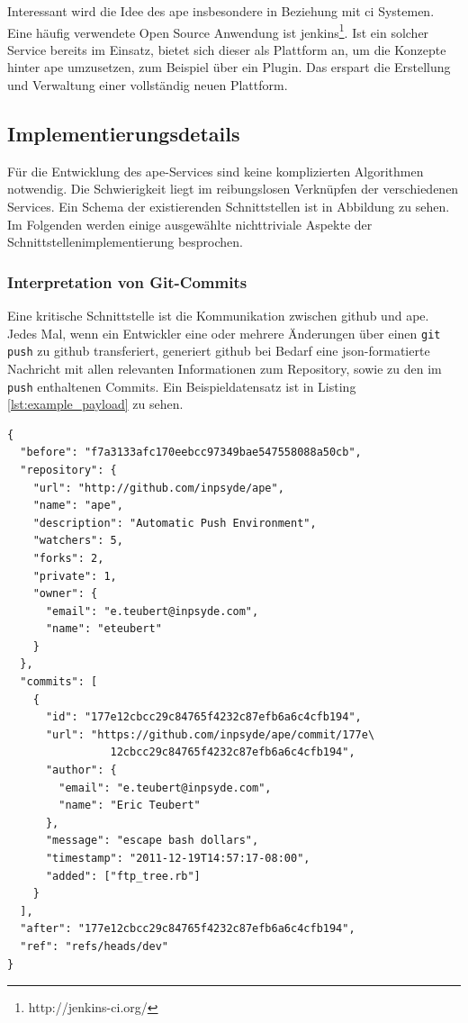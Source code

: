 Interessant wird die Idee des \gls{ape} insbesondere in Beziehung mit \gls{ci} Systemen. Eine häufig verwendete Open Source Anwendung ist \gls{jenkins}\footnote{http://jenkins-ci.org/}. Ist ein solcher Service bereits im Einsatz, bietet sich dieser als Plattform an, um die Konzepte hinter \gls{ape} umzusetzen, zum Beispiel über ein Plugin. Das erspart die Erstellung und Verwaltung einer vollständig neuen Plattform.


\subsection{Implementierungsdetails} %
\label{sub:implementierungsdetails}

Für die Entwicklung des \gls{ape}-Services sind keine komplizierten Algorithmen notwendig. Die Schwierigkeit liegt im reibungslosen Verknüpfen der verschiedenen Services. Ein Schema der existierenden Schnittstellen ist in Abbildung zu sehen. Im Folgenden werden einige ausgewählte nichttriviale Aspekte der Schnittstellenimplementierung besprochen.

\subsubsection{Interpretation von Git-Commits} %
\label{ssub:interpretation_von_git_commits}

Eine kritische Schnittstelle ist die Kommunikation zwischen \gls{github} und \gls{ape}. Jedes Mal, wenn ein Entwickler eine oder mehrere Änderungen über einen \lstinline!git push! zu \gls{github} transferiert, generiert \gls{github} bei Bedarf eine \gls{json}-formatierte Nachricht mit allen relevanten Informationen zum Repository, sowie zu den im \lstinline!push! enthaltenen Commits. Ein Beispieldatensatz ist in Listing \ref{lst:example_payload} zu sehen.

\begin{lstlisting}[caption=Beispiel-Webhook von \gls{github},label={lst:example_payload}]
{
  "before": "f7a3133afc170eebcc97349bae547558088a50cb",
  "repository": {
    "url": "http://github.com/inpsyde/ape",
    "name": "ape",
    "description": "Automatic Push Environment",
    "watchers": 5,
    "forks": 2,
    "private": 1,
    "owner": {
      "email": "e.teubert@inpsyde.com",
      "name": "eteubert"
    }
  },
  "commits": [
    {
      "id": "177e12cbcc29c84765f4232c87efb6a6c4cfb194",
      "url": "https://github.com/inpsyde/ape/commit/177e\
				12cbcc29c84765f4232c87efb6a6c4cfb194",
      "author": {
        "email": "e.teubert@inpsyde.com",
        "name": "Eric Teubert"
      },
      "message": "escape bash dollars",
      "timestamp": "2011-12-19T14:57:17-08:00",
      "added": ["ftp_tree.rb"]
    }
  ],
  "after": "177e12cbcc29c84765f4232c87efb6a6c4cfb194",
  "ref": "refs/heads/dev"
}
\end{lstlisting}

